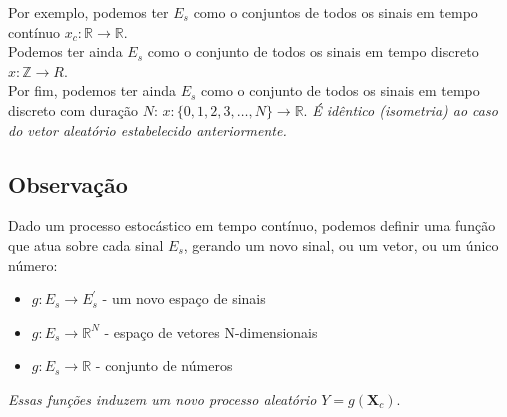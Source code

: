 \documentclass{article}
\begin{document}
Por exemplo, podemos ter $E_s$ como o conjuntos de todos os sinais em tempo contínuo $x_c :
\mathbb{R} \to \mathbb{R}$.
\\
Podemos ter ainda $E_s$ como o conjunto de todos os sinais em tempo discreto $x: \mathbb{Z} \to R$.
\\
Por fim, podemos ter ainda $E_s$ como o conjunto de todos os sinais em tempo discreto com duração
$N$: $x: \{0,1,2,3,\ldots, N\} \to \mathbb{R}$. \textit{É idêntico (isometria) ao caso do vetor
aleatório estabelecido anteriormente.}

\subsection{Observação}
Dado um processo estocástico em tempo contínuo, podemos definir uma função que atua sobre cada
sinal $E_s$, gerando um novo sinal, ou um vetor, ou um único número:

\begin{itemize}
    \item $g: E_s \to E_s^{'}$ - um novo espaço de sinais
    \item $g: E_s \to \mathbb{R}^N$ - espaço de vetores N-dimensionais
    \item $g: E_s \to \mathbb{R}$ - conjunto de números
\end{itemize}
\textit{Essas funções induzem um novo processo aleatório $Y = g(\mathbf{X}_c)$}.
\end{document}
